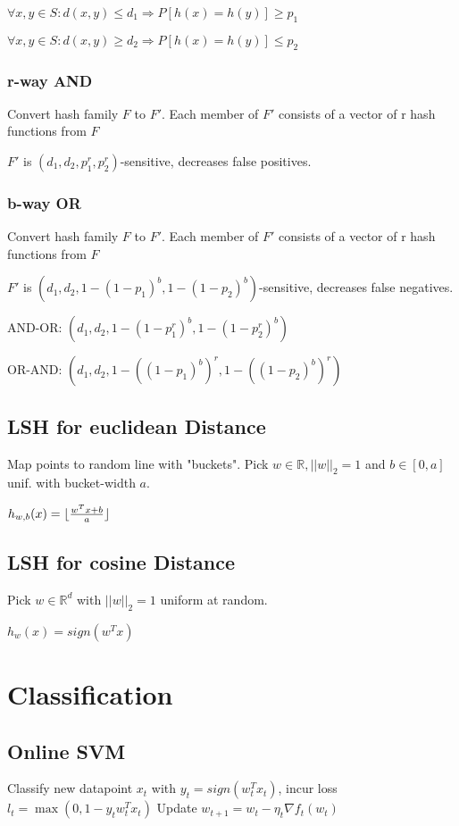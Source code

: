 \documentclass[a4paper,11pt,twocolumn]{article}
\begin{document}
$\forall x,y \in S : d(x,y) \leq  d_1 \Rightarrow P[h(x)=h(y)] \geq p_1$

$\forall x,y \in S : d(x,y) \geq  d_2 \Rightarrow P[h(x)=h(y)] \leq p_2$

\subsubsection{r-way AND}
Convert hash family $F$ to $F'$. Each member of $F'$ consists of a vector of r hash functions from $F$

$F'$ is $(d_1, d_2, p_1^r, p_2^r)$-sensitive, decreases false positives.

\subsubsection{b-way OR}
Convert hash family $F$ to $F'$. Each member of $F'$ consists of a vector of r hash functions from $F$

$F'$ is $(d_1, d_2, 1-(1-p_1)^b, 1-(1-p_2)^b)$-sensitive, decreases false negatives.

AND-OR: $(d_1,d_2,1-(1-p_1^r)^b,1-(1-p_2^r)^b)$

OR-AND: $(d_1,d_2,1-((1-p_1)^b)^r,1-((1-p_2)^b)^r)$




\subsection{LSH for euclidean Distance}
Map points to random line with "buckets". Pick $w \in \mathbb{R}, ||w||_2 = 1$ and $b \in [0,a]$ unif. with bucket-width $a$.

$h_{w,b}(x) = 
\lfloor
{{w^Tx + b}\over{a}}
\rfloor$

\subsection{LSH for cosine Distance}
Pick $w \in \mathbb{R}^d$ with $||w||_2=1$ uniform at random.

$h_w(x) = sign(w^Tx)$

\section{Classification}

\subsection{Online SVM}
Classify new datapoint $x_t$ with $y_t = sign(w_t^Tx_t)$, incur loss $l_t = \max (0,1-y_t w_t^T x_t)$ Update $w_{t+1} = w_t - \eta_t \nabla f_t(w_t)$
\end{document}
